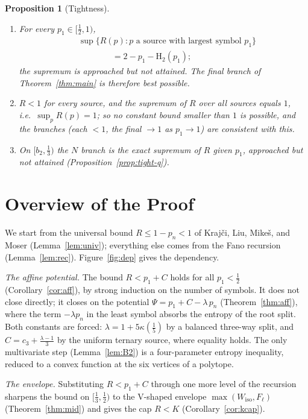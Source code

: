 \documentclass[journal]{IEEEtran}
\newtheorem{proposition}{Proposition}
\theoremstyle{definition}
\newcommand{\Hh}{\mathrm H_2}
\newcommand{\kp}{\kappa}
\newcommand{\CC}{C}
\newcommand{\lam}{\lambda}
\newcommand{\cthree}{c_3}
\begin{document}
\begin{proposition}[Tightness]\label{prop:tight}
\begin{enumerate}
\item[\textup{(a)}] For every $p_1\in[\tfrac12,1)$,
  \[
  \begin{aligned}
    &\sup\{R(p):p\text{ a source with largest symbol }p_1\}\\
    &\qquad\qquad=2-p_1-\Hh(p_1);
  \end{aligned}
  \]
  the supremum is approached but not attained. The final branch of
  Theorem~\ref{thm:main} is therefore best possible.
\item[\textup{(b)}] $R<1$ for every source, and the supremum of $R$ over all
  sources equals $1$, i.e.\ $\sup_{p} R(p)=1$; so no constant bound smaller than
  $1$ is possible, and the branches (each $<1$, the final $\to1$ as $p_1\to1$)
  are consistent with this.
\item[\textup{(c)}] On $[b_2,\tfrac13)$ the $N$ branch is the exact
  supremum of $R$ given $p_1$, approached but not attained
  (Proposition~\ref{prop:tight-q}).
\end{enumerate}
\end{proposition}

\section{Overview of the Proof}\label{sec:outline}

We start from the universal bound $R\le 1-p_n<1$ of Kraj\v{c}i, Liu, Mike\v{s},
and Moser \cite{Krajci15} (Lemma~\ref{lem:univ}); everything else comes from the
Fano recursion (Lemma~\ref{lem:rec}). Figure~\ref{fig:dep} gives the dependency.

\emph{The affine potential.} The bound $R<p_1+\CC$ holds for all $p_1<\tfrac12$
(Corollary~\ref{cor:aff}), by strong induction on the number of symbols. It does
not close directly; it closes on the potential $\Psi=p_1+\CC-\lam\,p_n$
(Theorem~\ref{thm:aff}), where the term $-\lam p_n$ in the least symbol absorbs
the entropy of the root split. Both constants are forced: $\lam=1+5\kp(\tfrac15)$
by a balanced three-way split, and $\CC=\cthree+\tfrac{\lam-1}3$ by the uniform
ternary source, where equality holds. The only multivariate step
(Lemma~\ref{lem:B2}) is a four-parameter entropy inequality, reduced to a convex
function at the six vertices of a polytope.

\emph{The envelope.} Substituting $R<p_1+\CC$ through one more level of the
recursion sharpens the bound on $[\tfrac13,\tfrac12)$ to the V-shaped envelope
$\max(W_{\mathrm{iso}},F_\ell)$ (Theorem~\ref{thm:mid}) and gives the cap $R<K$
(Corollary~\ref{cor:kcap}).
\end{document}
